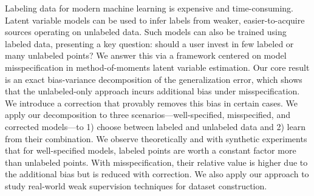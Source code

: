 Labeling data for modern machine learning is expensive and time-consuming. Latent variable models can be used to infer labels from weaker, easier-to-acquire sources operating on unlabeled data.
Such models can also be trained using labeled data, presenting a key question: should a user invest in few labeled or many unlabeled points? We answer this via a framework centered on model misspecification in method-of-moments latent variable estimation.
%
Our core result is an exact bias-variance decomposition of the generalization error, which shows that the unlabeled-only approach incurs additional bias under misspecification. We introduce a correction that provably removes this bias in certain cases.
%
We apply our decomposition to three scenarios---well-specified, misspecified, and corrected models---to 1) choose between labeled and unlabeled data and 2) learn from their combination. We observe theoretically and with synthetic experiments that for well-specified models, labeled points are worth a constant factor more than unlabeled points. With misspecification, their relative value is higher due to the additional bias but is reduced with correction. We also apply our approach to study real-world weak supervision techniques for dataset construction.




